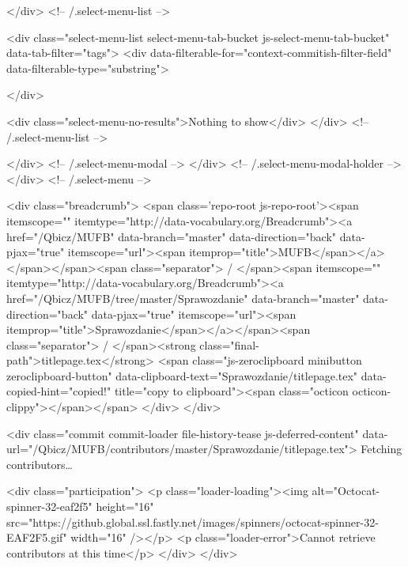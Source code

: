       </div> <!-- /.select-menu-list -->

      <div class="select-menu-list select-menu-tab-bucket js-select-menu-tab-bucket" data-tab-filter="tags">
        <div data-filterable-for="context-commitish-filter-field" data-filterable-type="substring">


        </div>

        <div class="select-menu-no-results">Nothing to show</div>
      </div> <!-- /.select-menu-list -->

    </div> <!-- /.select-menu-modal -->
  </div> <!-- /.select-menu-modal-holder -->
</div> <!-- /.select-menu -->

  <div class="breadcrumb">
    <span class='repo-root js-repo-root'><span itemscope="" itemtype="http://data-vocabulary.org/Breadcrumb"><a href="/Qbicz/MUFB" data-branch="master" data-direction="back" data-pjax="true" itemscope="url"><span itemprop="title">MUFB</span></a></span></span><span class="separator"> / </span><span itemscope="" itemtype="http://data-vocabulary.org/Breadcrumb"><a href="/Qbicz/MUFB/tree/master/Sprawozdanie" data-branch="master" data-direction="back" data-pjax="true" itemscope="url"><span itemprop="title">Sprawozdanie</span></a></span><span class="separator"> / </span><strong class="final-path">titlepage.tex</strong> <span class="js-zeroclipboard minibutton zeroclipboard-button" data-clipboard-text="Sprawozdanie/titlepage.tex" data-copied-hint="copied!" title="copy to clipboard"><span class="octicon octicon-clippy"></span></span>
  </div>
</div>


  <div class="commit commit-loader file-history-tease js-deferred-content" data-url="/Qbicz/MUFB/contributors/master/Sprawozdanie/titlepage.tex">
    Fetching contributors…

    <div class="participation">
      <p class="loader-loading"><img alt="Octocat-spinner-32-eaf2f5" height="16" src="https://github.global.ssl.fastly.net/images/spinners/octocat-spinner-32-EAF2F5.gif" width="16" /></p>
      <p class="loader-error">Cannot retrieve contributors at this time</p>
    </div>
  </div>


